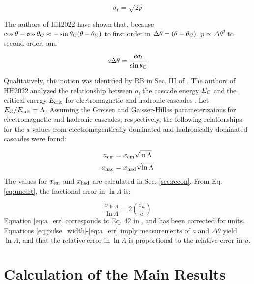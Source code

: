 \documentclass[amsmath,amssymb,aps,prd,10pt,twocolumn,showkeys]{revtex4}
\begin{document}
\begin{equation}
\sigma_t = \sqrt{2p} \label{eq:pulse_width}
\end{equation}

The authors of HH2022 have shown that, because $\cos\theta - \cos\theta_{\rm C} \approx -\sin\theta_{\rm C}(\theta-\theta_{\rm C})$ to first order in $\Delta\theta=(\theta-\theta_{\rm C})$, $p \propto \Delta\theta^2$ to second order, and 

\begin{equation}
a\Delta\theta = \frac{c \sigma_t}{\sin\theta_{\rm C}} \label{eq:uncert}
\end{equation}

Qualitatively, this notion was identified by RB in Sec. III of \cite{10.1103/physrevd.65.016003}.  The authors of HH2022 analyzed the relationship between $a$, the cascade energy $E_{\rm C}$ and the critical energy $E_{\rm crit}$ for electromagnetic and hadronic cascades \cite{PhysRevD.105.123019}.  Let $E_{\rm C}/E_{\rm crit} = \Lambda$.  Assuming the Greisen and Gaisser-Hillas parameterizaions for electromagnetic and hadronic cascades, respectively, the following relationships for the $a$-values from electromagentically dominated and hadronically dominated cascades were found:

\begin{align}
a_{\rm em} &= x_{\rm em} \sqrt{\ln\Lambda} \label{eq:em} \\
a_{\rm had} &= x_{\rm had} \sqrt{\ln\Lambda} \label{eq:had}
\end{align}
\noindent
The values for $x_{\rm em}$ and $x_{\rm had}$ are calculated in Sec. \ref{sec:recon}. From Eq. \ref{eq:uncert}, the fractional error in $\ln\Lambda$ is:

\begin{equation}
\frac{\sigma_{\ln\Lambda}}{\ln\Lambda} = 2\left(\frac{\sigma_a}{a}\right) \label{eq:a_err}
\end{equation}
\noindent
Equation \ref{eq:a_err} corresponds to Eq. 42 in \cite{PhysRevD.105.123019}, and has been corrected for units.  Equations \ref{eq:pulse_width}-\ref{eq:a_err} imply measurements of $a$ and $\Delta\theta$ yield $\ln\Lambda$, and that the relative error in $\ln\Lambda$ is proportional to the relative error in $a$.

\section{Calculation of the Main Results}
\label{sec:onc}
\end{document}
